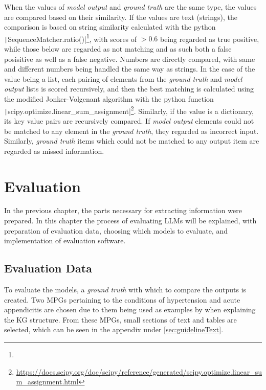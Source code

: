 \documentclass[bs, english]{stthesis}
\begin{document}
When the values of \textit{model output} and \textit{ground truth} are the same type, the values are compared based on their similarity. If the values are text (strings), the comparison is based on string similarity calculated with the python \texttt|SequenceMatcher.ratio()|\footnote{}, with scores of $>0.6$ being regarded as true positive, while those below are regarded as not matching and as such both a false posisitive as well as a false negative. Numbers are directly compared, with same and different numbers being handled the same way as strings.
In the case of the value being a list, each pairing of elements from the \textit{ground truth} and \textit{model output} lists is scored recursively, and then the best matching is calculated using the modified Jonker-Volgenant algorithm \cite{crouseImplementing2DRectangular2016} with the python function \texttt|scipy.optimize.linear_sum_assignment|\footnote{\href{https://docs.scipy.org/doc/scipy/reference/generated/scipy.optimize.linear_sum_assignment.html}{https://docs.scipy.org/doc/scipy/reference/generated/scipy.optimize.linear\_sum\_assignment.html}}. Similarly, if the value is a dictionary, its key value pairs are recursively compared.
If \textit{model output} elements could not be matched to any element in the \textit{ground truth}, they regarded as incorrect input. Similarly, \textit{ground truth} items which could not be matched to any output item are regarded as missed information. 

\chapter{Evaluation}
\label{ch:Evaluation}

In the previous chapter, the parts necessary for extracting information were prepared. In this chapter the process of evaluating LLMs will be explained, with preparation of evaluation data, choosing which models to evaluate, and implementation of evaluation software.

\section{Evaluation Data}
\label{sec:EvaluationData}

To evaluate the models, a \textit{ground truth} with which to compare the outputs is created.
Two MPGs pertaining to the conditions of hypertension \cite{mcevoy2024ESCGuidelines2024} and acute appendicitis \cite{snyderAcuteAppendicitisEfficient2018} are chosen due to them being used as examples by \cite{TOM} when explaining the KG structure.
From these MPGs, small sections of text and tables are selected, which can be seen in the appendix under \cref{sec:guidelineText}.
\end{document}
